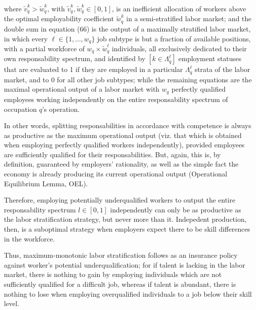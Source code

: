 \documentclass[hidelinks, nonatbib]{elsarticle}
\begin{document}
\begin{enumerate}
\begin{enumerate}
\begin{enumerate}
            where $\tilde{v}_{q}^{k} > \tilde{w}_{q}^{k}$, with $\tilde{v}_{q}^{k}, \tilde{w}_{q}^{k} \in [0,1]$, is an inefficient allocation of workers above the optimal employability coefficient $\tilde{w}_{q}^{k}$ in a semi-stratified labor market; and the double sum in equation (66) is the output of a maximally stratified labor market, in which every $\ell \in \{1, \dots, w_q\}$ job subtype is but a fraction of available positions, with a partial workforce of $w_q \times \tilde{w}_{q}^{\ell}$ individuals, all exclusively dedicated to their own responsability spectrum, and identified by $[k \in \Lambda_{q}^{\ell}]$ employment statuses that are evaluated to 1 if they are employed in a particular $\Lambda_{q}^{\ell}$ strata of the labor market, and to 0 for all other job subtypes; while the remaining equations are the maximal operational output of a labor market with $w_q$ perfectly qualified employees working independently on the entire responsability spectrum of occupation $q$'s operation.

            In other words, splitting responsabilities in accordance with competence is always as productive as the maximum operational output (viz. that which is obtained when employing perfectly qualified workers independently), provided employees are sufficiently qualified for their responsabilities. But, again, this is, by definition, guaranteed by employers' rationality, as well as the simple fact the economy is already producing its current operational output (Operational Equilibrium Lemma, OEL). 
            
            Therefore, employing potentially underqualified workers to output the entire responsability spectrum $l \in [0,1]$ independently can only be as productive as the labor stratification strategy, but never more than it. Indepedent production, then, is a suboptimal strategy when employers expect there to be skill differences in the workforce.
            
            Thus, maximum-monotonic labor stratification follows as an insurance policy against worker's potential underqualification; for if talent is lacking in the labor market, there is nothing to gain by employing individuals which are not sufficiently qualified for a difficult job, whereas if talent is abundant, there is nothing to lose when employing overqualified individuals to a job below their skill level.


\end{enumerate}
\end{enumerate}
\end{enumerate}
\end{document}
